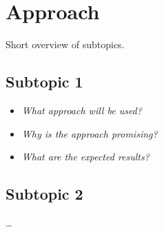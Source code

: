 \section{Approach}
\label{sec:Approach}

Short overview of subtopics.

\subsection{Subtopic 1}
\begin{itemize}
	\item \emph{What approach will be used?}
	\item \emph{Why is the approach promising?}
	\item \emph{What are the expected results?}
\end{itemize}

\subsection{Subtopic 2}
\ldots